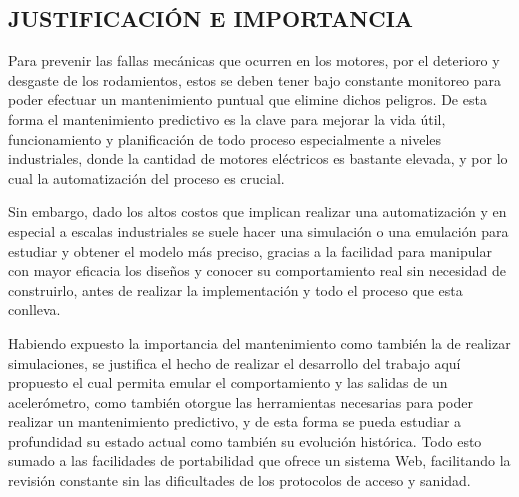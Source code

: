 \subsection{JUSTIFICACIÓN E IMPORTANCIA}

Para prevenir las fallas mecánicas que ocurren en los motores, por el deterioro
y desgaste de los rodamientos, estos se deben tener bajo constante monitoreo
para poder efectuar un mantenimiento puntual que elimine dichos peligros. De
esta forma el mantenimiento predictivo es la clave para mejorar la vida útil,
funcionamiento y planificación de todo proceso especialmente a niveles
industriales, donde la cantidad de motores eléctricos es bastante elevada, y
por lo cual la automatización del proceso es crucial.

Sin embargo, dado los altos costos que implican realizar una automatización y
en especial a escalas industriales se suele hacer una simulación o una
emulación para estudiar y obtener el modelo más preciso, gracias a la facilidad
para manipular con mayor eficacia los diseños y conocer su comportamiento real
sin necesidad de construirlo, antes de realizar la implementación y todo el
proceso que esta conlleva.

Habiendo expuesto la importancia del mantenimiento como también la de realizar
simulaciones, se justifica el hecho de realizar el desarrollo del trabajo aquí
propuesto el cual permita emular el comportamiento y las salidas de un
acelerómetro, como también otorgue las herramientas necesarias para poder
realizar un mantenimiento predictivo, y de esta forma se pueda estudiar a
profundidad su estado actual como también su evolución histórica. Todo esto
sumado a las facilidades de portabilidad que ofrece un sistema Web, facilitando
la revisión constante sin las dificultades de los protocolos de acceso y
sanidad.
